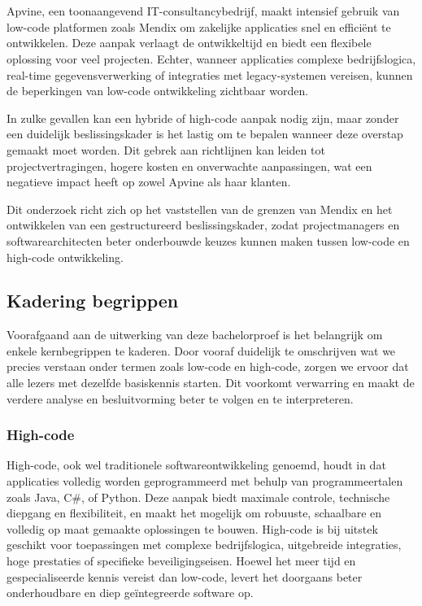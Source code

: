 
\chapter{}%
\label{ch:inleiding}

Apvine, een toonaangevend IT-consultancybedrijf, maakt intensief gebruik van low-code platformen zoals Mendix om zakelijke applicaties snel en efficiënt te ontwikkelen. Deze aanpak verlaagt de ontwikkeltijd en biedt een flexibele oplossing voor veel projecten. Echter, wanneer applicaties complexe bedrijfslogica, real-time gegevensverwerking of integraties met legacy-systemen vereisen, kunnen de beperkingen van low-code ontwikkeling zichtbaar worden.

In zulke gevallen kan een hybride of high-code aanpak nodig zijn, maar zonder een duidelijk beslissingskader is het lastig om te bepalen wanneer deze overstap gemaakt moet worden. Dit gebrek aan richtlijnen kan leiden tot projectvertragingen, hogere kosten en onverwachte aanpassingen, wat een negatieve impact heeft op zowel Apvine als haar klanten.

Dit onderzoek richt zich op het vaststellen van de grenzen van Mendix en het ontwikkelen van een gestructureerd beslissingskader, zodat projectmanagers en softwarearchitecten beter onderbouwde keuzes kunnen maken tussen low-code en high-code ontwikkeling.

\section{Kadering begrippen}
Voorafgaand aan de uitwerking van deze bachelorproef is het belangrijk om enkele kernbegrippen te kaderen. Door vooraf duidelijk te omschrijven wat we precies verstaan onder termen zoals low-code en high-code, zorgen we ervoor dat alle lezers met dezelfde basiskennis starten. Dit voorkomt verwarring en maakt de verdere analyse en besluitvorming beter te volgen en te interpreteren.
\subsection{High-code}
High-code, ook wel traditionele softwareontwikkeling genoemd, houdt in dat applicaties volledig worden geprogrammeerd met behulp van programmeertalen zoals Java, C\#, of Python. Deze aanpak biedt maximale controle, technische diepgang en flexibiliteit, en maakt het mogelijk om robuuste, schaalbare en volledig op maat gemaakte oplossingen te bouwen. High-code is bij uitstek geschikt voor toepassingen met complexe bedrijfslogica, uitgebreide integraties, hoge prestaties of specifieke beveiligingseisen. Hoewel het meer tijd en gespecialiseerde kennis vereist dan low-code, levert het doorgaans beter onderhoudbare en diep geïntegreerde software op.
